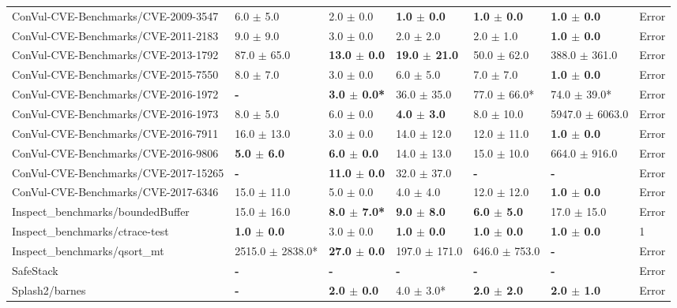 \begin{table}
\begin{spacing}{1.5}
\begin{tabular}{lllllll}
ConVul-CVE-Benchmarks/CVE-2009-3547 & 6.0 $\pm$ 5.0 & 2.0 $\pm$ 0.0 & \textbf{ 1.0 $\pm$ 0.0 } & \textbf{ 1.0 $\pm$ 0.0 } & \textbf{ 1.0 $\pm$ 0.0 } & Error \\
ConVul-CVE-Benchmarks/CVE-2011-2183 & 9.0 $\pm$ 9.0 & 3.0 $\pm$ 0.0 & 2.0 $\pm$ 2.0 & 2.0 $\pm$ 1.0 & \textbf{ 1.0 $\pm$ 0.0 } & Error \\
ConVul-CVE-Benchmarks/CVE-2013-1792 & 87.0 $\pm$ 65.0 & \textbf{ 13.0 $\pm$ 0.0 } & \textbf{ 19.0 $\pm$ 21.0 } & 50.0 $\pm$ 62.0 & 388.0 $\pm$ 361.0 & Error \\
ConVul-CVE-Benchmarks/CVE-2015-7550 & 8.0 $\pm$ 7.0 & 3.0 $\pm$ 0.0 & 6.0 $\pm$ 5.0 & 7.0 $\pm$ 7.0 & \textbf{ 1.0 $\pm$ 0.0 } & Error \\
ConVul-CVE-Benchmarks/CVE-2016-1972 & \textbf{ - } & \textbf{ 3.0 $\pm$ 0.0* } & 36.0 $\pm$ 35.0 & 77.0 $\pm$ 66.0* & 74.0 $\pm$ 39.0* & Error \\
ConVul-CVE-Benchmarks/CVE-2016-1973 & 8.0 $\pm$ 5.0 & 6.0 $\pm$ 0.0 & \textbf{ 4.0 $\pm$ 3.0 } & 8.0 $\pm$ 10.0 & 5947.0 $\pm$ 6063.0 & Error \\
ConVul-CVE-Benchmarks/CVE-2016-7911 & 16.0 $\pm$ 13.0 & 3.0 $\pm$ 0.0 & 14.0 $\pm$ 12.0 & 12.0 $\pm$ 11.0 & \textbf{ 1.0 $\pm$ 0.0 } & Error \\
ConVul-CVE-Benchmarks/CVE-2016-9806 & \textbf{ 5.0 $\pm$ 6.0 } & \textbf{ 6.0 $\pm$ 0.0 } & 14.0 $\pm$ 13.0 & 15.0 $\pm$ 10.0 & 664.0 $\pm$ 916.0 & Error \\
ConVul-CVE-Benchmarks/CVE-2017-15265 & \textbf{ - } & \textbf{ 11.0 $\pm$ 0.0 } & 32.0 $\pm$ 37.0 & \textbf{ - } & \textbf{ - } & Error \\
ConVul-CVE-Benchmarks/CVE-2017-6346 & 15.0 $\pm$ 11.0 & 5.0 $\pm$ 0.0 & 4.0 $\pm$ 4.0 & 12.0 $\pm$ 12.0 & \textbf{ 1.0 $\pm$ 0.0 } & Error \\
Inspect\_benchmarks/boundedBuffer & 15.0 $\pm$ 16.0 & \textbf{ 8.0 $\pm$ 7.0* } & \textbf{ 9.0 $\pm$ 8.0 } & \textbf{ 6.0 $\pm$ 5.0 } & 17.0 $\pm$ 15.0 & Error \\
Inspect\_benchmarks/ctrace-test & \textbf{ 1.0 $\pm$ 0.0 } & 3.0 $\pm$ 0.0 & \textbf{ 1.0 $\pm$ 0.0 } & \textbf{ 1.0 $\pm$ 0.0 } & \textbf{ 1.0 $\pm$ 0.0 } & 1 \\
Inspect\_benchmarks/qsort\_mt & 2515.0 $\pm$ 2838.0* & \textbf{ 27.0 $\pm$ 0.0 } & 197.0 $\pm$ 171.0 & 646.0 $\pm$ 753.0 & \textbf{ - } & Error \\
SafeStack & \textbf{ - } & \textbf{ - } & \textbf{ - } & \textbf{ - } & \textbf{ - } & Error \\
Splash2/barnes & \textbf{ - } & \textbf{ 2.0 $\pm$ 0.0 } & 4.0 $\pm$ 3.0* & \textbf{ 2.0 $\pm$ 2.0 } & \textbf{ 2.0 $\pm$ 1.0 } & Error \\

\end{tabular}
\end{spacing}
\end{table}
